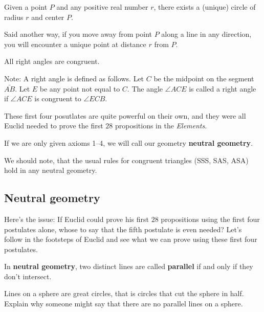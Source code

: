 \documentclass[noauthor,nooutcomes,12pt,hints,newpage,handout]{ximera}
\begin{document}
\begin{axiom}
Given a point $P$ and any positive real number $r$, there exists a
(unique) circle of radius $r$ and center $P$. 

Said another way, if you move away from point $P$ along a line in any
direction, you will encounter a unique point at distance $r$ from $P$.
\end{axiom}

\begin{axiom}
All right angles are congruent.

Note: A right angle is defined as follows. Let $C$ be the midpoint on
the segment $\bar{AB}$. Let $E$ be any point not equal to
$C$. The angle $\angle ACE$ is called a right angle if $\angle ACE$ is
congruent to $\angle ECB$. 
\end{axiom}

These first four posutlates are quite powerful on their own, and they
were all Euclid needed to prove the first $28$ propositions in the
\textit{Elements}.


\begin{definition}
If we are only given axioms 1--4, we will call our geometry
\textbf{neutral geometry}.
\end{definition}


We should note, that the usual rules for congruent triangles (SSS, SAS,
ASA) hold in any neutral geometry.



\subsection{Neutral geometry}


Here's the issue: If Euclid could prove his first $28$ propositions
using the first four postulates alone, whose to say that the fifth
postulate is even needed?  Let's follow in the footsteps of Euclid and
see what we can prove using these first four postulates.



\begin{definition}
In \textbf{neutral geometry}, two distinct lines are called \textbf{parallel} if and
only if they don't intersect.
\end{definition}





\begin{problem}
 Lines on a sphere are great circles, that is circles that cut the
 sphere in half. Explain why someone might say that there are no
 parallel lines on a sphere.
\end{problem}
   
\end{document}

